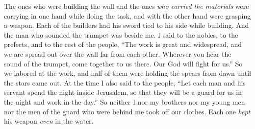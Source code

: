 \begin{biblechapter}
\verse The ones who were building the wall and the ones \textit{who carried the materials} were carrying in one hand while doing the task, and with the other hand were grasping a weapon.
\verse Each of the builders had his sword tied to his side while building. And the man who sounded the trumpet was beside me.
\verse I said to the nobles, to the prefects, and to the rest of the people, “The work is great and widespread, and we are spread out over the wall far from each other.
\verse Wherever you hear the sound of the trumpet, come together to us there. Our God will fight for us.”
\verse So we labored at the work, and half of them were holding the spears from dawn until the stars came out.
\verse At the time I also said to the people, “Let each man and his servant spend the night inside Jerusalem, so that they will be a guard for us in the night and work in the day.”
\verse So neither I nor my brothers nor my young men nor the men of the guard who were behind me took off our clothes. Each one \textit{kept} his weapon \textit{even} in the water.
\end{biblechapter}

